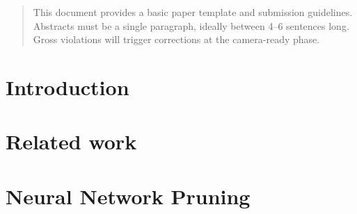 \documentclass[nohyperref]{article}
\theoremstyle{plain}
\theoremstyle{definition}
\theoremstyle{remark}
\begin{document}
\printAffiliationsAndNotice{\icmlEqualContribution} %

\begin{abstract}
This document provides a basic paper template and submission guidelines.
Abstracts must be a single paragraph, ideally between 4--6 sentences long.
Gross violations will trigger corrections at the camera-ready phase.
\end{abstract}

\section{Introduction}


\section{Related work}


    

\section{Neural Network Pruning}
\end{document}
